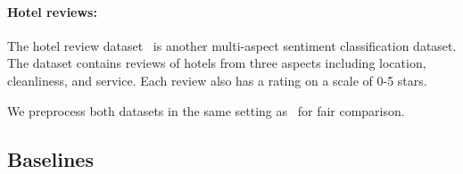 \documentclass[letterpaper]{article} %
\begin{document}

\paragraph{Hotel reviews:} The hotel review dataset~\cite{Bao2018DerivingMA} is another multi-aspect  sentiment classification dataset. 
The dataset contains reviews of hotels from three aspects including location, cleanliness, and service. 
Each review also has a rating on a scale of 0-5 stars. 

We preprocess both datasets in the same setting as~\cite{chang2019game} for fair comparison. 





\subsection{Baselines}
\end{document}
